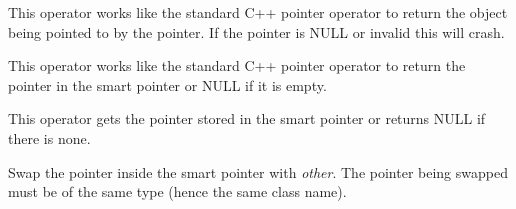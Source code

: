 

This operator works like the standard C++ pointer operator to return the object
being pointed to by the pointer.  If the pointer is NULL or invalid this will
crash.



This operator works like the standard C++ pointer operator to return the pointer
in the smart pointer or NULL if it is empty.



This operator gets the pointer stored in the smart pointer or returns NULL if
there is none.



Swap the pointer inside the smart pointer with {\it other}. The pointer being
swapped must be of the same type (hence the same class name).

